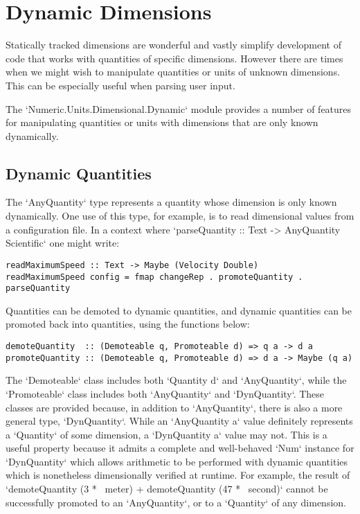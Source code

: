 \documentclass[11pt]{report}
\begin{document}
\chapter{Dynamic Dimensions}

Statically tracked dimensions are wonderful and vastly simplify development of code that works with quantities of specific
dimensions. However there are times when we might wish to manipulate quantities or units of unknown dimensions. This can be
especially useful when parsing user input.

The `Numeric.Units.Dimensional.Dynamic` module provides a number of features for manipulating quantities or units with dimensions that are only
known dynamically.

\section{Dynamic Quantities}

The `AnyQuantity` type represents a quantity whose dimension is only known dynamically. One use of this
type, for example, is to read dimensional values from a configuration file. In a context where
`parseQuantity :: Text -> AnyQuantity Scientific` one might write:

\begin{lstlisting}
readMaximumSpeed :: Text -> Maybe (Velocity Double)
readMaximumSpeed config = fmap changeRep . promoteQuantity . parseQuantity
\end{lstlisting}

Quantities can be demoted to dynamic quantities, and dynamic quantities can be promoted back into quantities,
using the functions below:

\begin{lstlisting}
demoteQuantity  :: (Demoteable q, Promoteable d) => q a -> d a
promoteQuantity :: (Demoteable q, Promoteable d) => d a -> Maybe (q a)
\end{lstlisting}

The `Demoteable` class includes both `Quantity d` and `AnyQuantity`, while the `Promoteable` class includes both
`AnyQuantity` and `DynQuantity`. These classes are provided because, in addition to `AnyQuantity`, there is also a more general type, `DynQuantity`.
While an `AnyQuantity a` value definitely represents a `Quantity` of some dimension, a `DynQuantity a` value may not.
This is a useful property because it admits a complete and well-behaved `Num` instance for `DynQuantity` which allows
arithmetic to be performed with dynamic quantities which is nonetheless dimensionally verified at runtime. For example,
the result of `demoteQuantity (3 *~ meter) + demoteQuantity (47 *~ second)` cannot be successfully promoted to an
`AnyQuantity`, or to a `Quantity` of any dimension.
\end{document}
